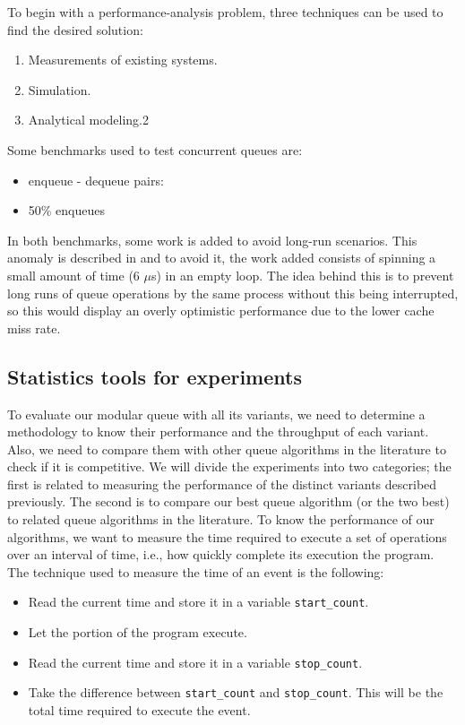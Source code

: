To begin with a performance-analysis problem, three techniques can be used to find the desired solution:

\begin{enumerate}
\item Measurements of existing systems.
\item Simulation.
\item Analytical modeling.2
\end{enumerate}

Some benchmarks used to test concurrent queues are:

\begin{itemize}
\item enqueue - dequeue pairs:
\item 50\% enqueues
\end{itemize}

In both benchmarks, some work is added to avoid long-run scenarios. This
anomaly is described in \cite{DBLP_conf_podc_MichaelS96} and to avoid it, the
work added consists of spinning a small amount of time (6 \(\mu\)s) in an
empty loop. The idea behind this is to prevent long runs of queue operations
by the same process without this being interrupted, so this would display
an overly optimistic performance due to the lower cache miss rate.


\subsection{Statistics tools for experiments}
\label{sec:orga1c9a7a}

To evaluate our modular queue with all its variants, we need to determine a
methodology to know their performance and the throughput of each
variant. Also, we need to compare them with other queue algorithms in the
literature to check if it is competitive. We will divide the experiments into
two categories; the first is related to measuring the performance of the
distinct variants described previously. The second is to compare our best
queue algorithm (or the two best) to related queue algorithms in the
literature. To know the performance of our algorithms, we want to measure the
time required to execute a set of operations over an interval of time, i.e.,
how quickly complete its execution the program. The technique used to measure
the time of an event is the following:

\begin{itemize}
\item Read the current time and store it in a variable \texttt{start\_count}.
\item Let the portion of the program execute.
\item Read the current time and store it in a variable \texttt{stop\_count}.
\item Take the difference between \texttt{start\_count} and \texttt{stop\_count}. This will be the
total time required to execute the event.
\end{itemize}

